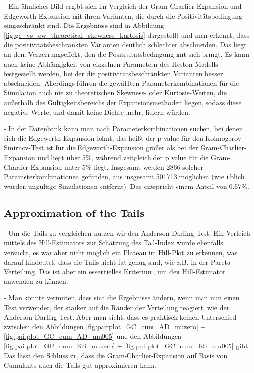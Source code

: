 - Ein ähnliches Bild ergibt sich im Vergleich der Gram-Charlier-Expansion und Edgeworth-Expansion mit ihren Varianten, die durch die Positivitätsbedingung eingeschränkt sind. Die Ergebnisse sind in Abbildung \ref{fig:gc_vs_ew_theoretical_skewness_kurtosis} dargestellt und man erkennt, dass die positivitätsbeschränkten Varianten deutlich schlechter abschneiden. Das liegt an dem Verzerrungseffekt, den die Positivitätsbedingung mit sich bringt. Es kann auch keine Abhängigkeit von einzelnen Parametern des Heston-Modells festgestellt werden, bei der die positivitätsbeschränkten Varianten besser abschneiden. Allerdings führen die gewählten Parameterkombinationen für die Simulation auch nie zu theoretischen Skewness- oder Kurtosis-Werten, die außerhalb des Gültigkeitsbereichs der Expansionsmethoden liegen, sodass diese negative Werte, und damit keine Dichte mehr, liefern würden.

- In der Datenbank kann man nach Parameterkombinationen suchen, bei denen sich die Edgeworth-Expansion lohnt, das heißt der p value für den Kolmogorov-Smirnov-Test ist für die Edgeworth-Expansion größer als bei der Gram-Charlier-Expansion und liegt über 5\%, während zeitgleich der p value für die Gram-Charlier-Expansion unter 5\% liegt. Insgesamt werden 2866 solcher Parameterkombinationen gefunden, aus insgesamt 501713 möglichen (wie üblich wurden ungültige Simulationen entfernt). Das entspricht einem Anteil von 0.57\%.

\subsection{Approximation of the Tails}
- Um die Tails zu vergleichen nutzen wir den Anderson-Darling-Test. Ein Verleich mittels des Hill-Estimators zur Schätzung des Tail-Index wurde ebenfalls versucht, es war aber nicht möglich ein Plateau im Hill-Plot zu erkennen, was darauf hindeutet, dass die Tails nicht fat genug sind, wie z.B. in der Pareto-Verteilung. Das ist aber ein essentielles Kriterium, um den Hill-Estimator anwenden zu können. 

- Man könnte vermuten, dass sich die Ergebnisse ändern, wenn man nun einen Test verwendet, der stärker auf die Ränder der Verteilung reagiert, wie den Anderson-Darling-Test. Aber man sieht, dass es praktisch keinen Unterschied zwischen den Abbildungen \ref{fig:pairplot_GC_cum_AD_muzero} + \ref{fig:pairplot_GC_cum_AD_mu005} und den Abbildungen \ref{fig:pairplot_GC_cum_KS_muzero} + \ref{fig:pairplot_GC_cum_KS_mu005} gibt. Das lässt den Schluss zu, dass die Gram-Charlier-Expansion auf Basis von Cumulants auch die Tails gut approximieren kann.

